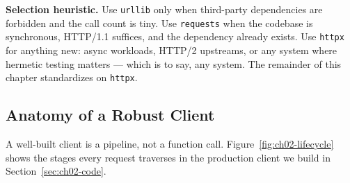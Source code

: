 \textbf{Selection heuristic.} Use \texttt{urllib} only when third-party
dependencies are forbidden and the call count is tiny. Use \texttt{requests}
when the codebase is synchronous, HTTP/1.1 suffices, and the dependency
already exists. Use \texttt{httpx} for anything new: async workloads, HTTP/2
upstreams, or any system where hermetic testing matters --- which is to say,
any system. The remainder of this chapter standardizes on \texttt{httpx}.

\subsection{Anatomy of a Robust Client}
\label{sec:ch02-anatomy}

A well-built client is a pipeline, not a function call.
Figure~\ref{fig:ch02-lifecycle} shows the stages every request traverses in
the production client we build in Section~\ref{sec:ch02-code}.

